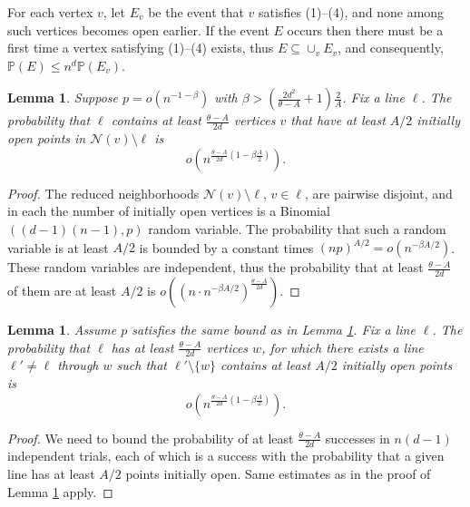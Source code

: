 \documentclass{amsart}
\newcommand{\prob}{\mathbb{P}}
\newcommand{\threshold}{\theta}
\numberwithin{equation}{section}
\newcommand{\Ln}{\ell}
\newtheorem{lemma}[theorem]{Lemma}
\theoremstyle{definition}
\theoremstyle{remark}
\begin{document}
For each vertex $v$, let $E_v$ be the event that $v$ satisfies (1)--(4), and none among
such vertices becomes open earlier. If the event $E$ occurs then there must be 
a first time a vertex satisfying (1)--(4) exists, thus $E \subseteq \cup_v E_v$, and
consequently, $\prob(E) \le n^d \prob(E_v)$.

\begin{lemma}\label{cajunsprel1}
Suppose $p = o(n^{-1-\beta})$ with $\beta > (\frac{2d^2}{\threshold-A}+1)\frac{2}{A}$.  Fix a line $\Ln$. The probability that $\Ln$ contains at least $\frac{\threshold-A}{2d}$ vertices $v$ 
that have at least $A/2$ initially open points in $\mathcal{N}(v)\setminus \Ln$  is 
$$%
o\left(n^{\frac{\threshold-A}{2d}(1-\beta\frac{A}{2})}\right).
$$
\end{lemma}
\begin{proof}
The reduced neighborhoods $\mathcal{N}(v)\setminus \Ln$, $v\in\Ln$, are pairwise 
disjoint, and in each
the number of initially open vertices is a Binomial$((d-1)(n-1),p)$ random variable.
The probability that such a random variable is at least $A/2$ is bounded 
by a constant times $(np)^{A/2}=o\left(n^{-\beta A/2}\right)$. These
random variables are independent, thus the probability that at least $\frac{\threshold-A}{2d}$ of them
are at least $A/2$ is  $o\left((n\cdot n^{-\beta A/2})^\frac{\threshold-A}{2d}\right)$.
\end{proof}

\begin{lemma}\label{cajunsprel2}
Assume $p$ satisfies the same bound as in Lemma \ref{cajunsprel1}. 
Fix a line $\Ln$. The probability that $\Ln$ has at least $\frac{\threshold-A}{2d}$ vertices $w$,
for which there exists a line $\Ln'\ne \Ln$ through $w$ such that 
$\Ln'\setminus \{w\}$ contains at least $A/2$ initially open points is 
$$o\left(n^{\frac{\threshold-A}{2d}(1-\beta\frac{A}{2})}\right).$$
\end{lemma}
\begin{proof} We need to bound the probability of at least  
$\frac{\threshold-A}{2d}$ successes in 
$n(d-1)$ independent trials, each of which is a success with  
the probability that a given line has at least $A/2$ points initially open. 
Same estimates as in the proof of Lemma \ref{cajunsprel1} apply.
\end{proof}
\end{document}
